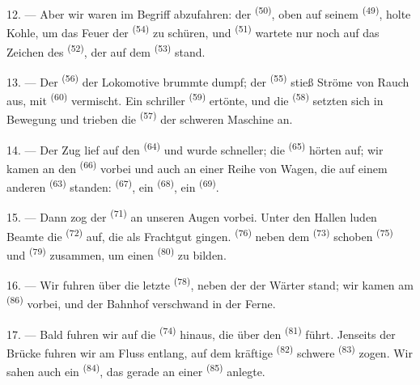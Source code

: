 12. --- Aber wir waren im Begriff abzufahren: der 
\textsuperscript{(50)}, oben auf seinem  \textsuperscript{(49)}, holte
Kohle, um das Feuer der  \textsuperscript{(54)} zu schüren, und
 \textsuperscript{(51)} wartete nur noch auf das Zeichen des
 \textsuperscript{(52)}, der auf dem 
\textsuperscript{(53)} stand.

13. --- Der  \textsuperscript{(56)} der Lokomotive brummte dumpf; der
 \textsuperscript{(55)} stieß Ströme von Rauch aus, mit
 \textsuperscript{(60)} vermischt. Ein schriller 
\textsuperscript{(59)} ertönte, und die  \textsuperscript{(58)} setzten
sich in Bewegung und trieben die  \textsuperscript{(57)} der schweren
Maschine an.

\VUsaut{3.0mm}
\VUsaut{3.0mm}

14. --- Der Zug lief auf den  \textsuperscript{(64)} und wurde
schneller; die  \textsuperscript{(65)} hörten auf; wir kamen an den
 \textsuperscript{(66)} vorbei und auch an einer Reihe von Wagen, die
auf einem anderen  \textsuperscript{(63)} standen:
 \textsuperscript{(67)}, ein 
\textsuperscript{(68)}, ein  \textsuperscript{(69)}.


15. --- Dann zog der  \textsuperscript{(71)} an unseren Augen
vorbei. Unter den Hallen luden Beamte die  \textsuperscript{(72)} auf,
die als Frachtgut gingen.  \textsuperscript{(76)} neben dem
 \textsuperscript{(73)} schoben 
\textsuperscript{(75)} und  \textsuperscript{(79)} zusammen, um
einen  \textsuperscript{(80)} zu bilden.

16. --- Wir fuhren über die letzte  \textsuperscript{(78)}, neben der
der Wärter stand; wir kamen am  \textsuperscript{(86)} vorbei, und der
Bahnhof verschwand in der Ferne.

17. --- Bald fuhren wir auf die  \textsuperscript{(74)} hinaus,
die über den  \textsuperscript{(81)} führt. Jenseits der Brücke fuhren
wir am Fluss entlang, auf dem kräftige 
\textsuperscript{(82)} schwere  \textsuperscript{(83)} zogen. Wir sahen
auch ein  \textsuperscript{(84)}, das gerade an einer
 \textsuperscript{(85)} anlegte.

